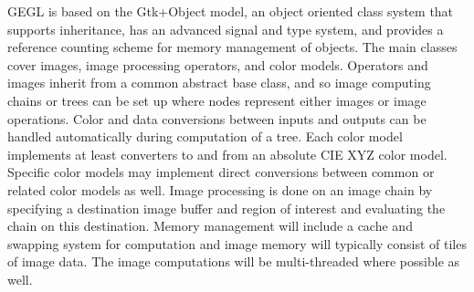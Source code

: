 GEGL is based on the Gtk+Object model, an object oriented class system that
supports inheritance, has an advanced signal and type system, and provides a
reference counting scheme for memory management of objects. The main classes
cover images, image processing operators, and color models.  Operators and
images inherit from a common abstract base class, and so image computing chains
or trees can be set up where nodes represent either images or image operations.
Color and data conversions between inputs and outputs can be handled
automatically during computation of a tree. Each color model implements at
least converters to and from an absolute CIE XYZ color model. Specific color
models may implement direct conversions between common or related color models
as well. Image processing is done on an image chain by specifying a destination
image buffer and region of interest and evaluating the chain on this
destination.  Memory management will include a cache and swapping system for
computation and image memory will typically consist of tiles of image data. The
image computations will be multi-threaded where possible as well.  
